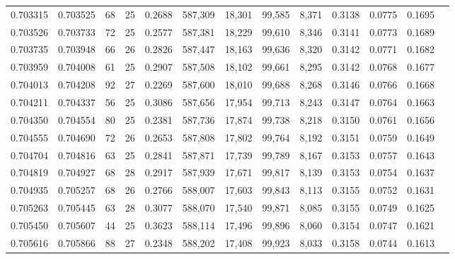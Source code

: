 \begin{tabular}{rrrrrrrrrrrrr}
0.703315 & 0.703525 &  68 &  25 &                                     0.2688 & 587,309 &  18,301 &  99,585 &   8,371 & 0.3138 & 0.0775 & 0.1695 \\
0.703526 & 0.703733 &  72 &  25 &                                     0.2577 & 587,381 &  18,229 &  99,610 &   8,346 & 0.3141 & 0.0773 & 0.1689 \\
0.703735 & 0.703948 &  66 &  26 &                                     0.2826 & 587,447 &  18,163 &  99,636 &   8,320 & 0.3142 & 0.0771 & 0.1682 \\
0.703959 & 0.704008 &  61 &  25 &                                     0.2907 & 587,508 &  18,102 &  99,661 &   8,295 & 0.3142 & 0.0768 & 0.1677 \\
0.704013 & 0.704208 &  92 &  27 &                                     0.2269 & 587,600 &  18,010 &  99,688 &   8,268 & 0.3146 & 0.0766 & 0.1668 \\
0.704211 & 0.704337 &  56 &  25 &                                     0.3086 & 587,656 &  17,954 &  99,713 &   8,243 & 0.3147 & 0.0764 & 0.1663 \\
0.704350 & 0.704554 &  80 &  25 &                                     0.2381 & 587,736 &  17,874 &  99,738 &   8,218 & 0.3150 & 0.0761 & 0.1656 \\
0.704555 & 0.704690 &  72 &  26 &                                     0.2653 & 587,808 &  17,802 &  99,764 &   8,192 & 0.3151 & 0.0759 & 0.1649 \\
0.704704 & 0.704816 &  63 &  25 &                                     0.2841 & 587,871 &  17,739 &  99,789 &   8,167 & 0.3153 & 0.0757 & 0.1643 \\
0.704819 & 0.704927 &  68 &  28 &                                     0.2917 & 587,939 &  17,671 &  99,817 &   8,139 & 0.3153 & 0.0754 & 0.1637 \\
0.704935 & 0.705257 &  68 &  26 &                                     0.2766 & 588,007 &  17,603 &  99,843 &   8,113 & 0.3155 & 0.0752 & 0.1631 \\
0.705263 & 0.705445 &  63 &  28 &                                     0.3077 & 588,070 &  17,540 &  99,871 &   8,085 & 0.3155 & 0.0749 & 0.1625 \\
0.705450 & 0.705607 &  44 &  25 &                                     0.3623 & 588,114 &  17,496 &  99,896 &   8,060 & 0.3154 & 0.0747 & 0.1621 \\
0.705616 & 0.705866 &  88 &  27 &                                     0.2348 & 588,202 &  17,408 &  99,923 &   8,033 & 0.3158 & 0.0744 & 0.1613 \\

\end{tabular}
